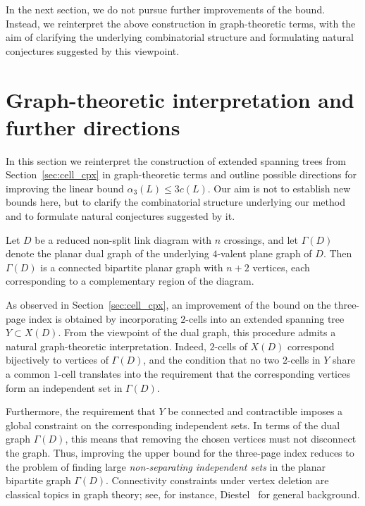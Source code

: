 \documentclass[11pt,a4paper]{amsart}
\begin{document}
In the next section, we do not pursue further improvements of the bound.
Instead, we reinterpret the above construction in graph-theoretic terms,
with the aim of clarifying the underlying combinatorial structure
and formulating natural conjectures suggested by this viewpoint.



\section{Graph-theoretic interpretation and further directions}\label{sec:graph}

In this section we reinterpret the construction of extended spanning trees
from Section~\ref{sec:cell_cpx} in graph-theoretic terms and outline
possible directions for improving the linear bound
$\alpha_3(L)\le 3c(L)$.
Our aim is not to establish new bounds here,
but to clarify the combinatorial structure underlying our method
and to formulate natural conjectures suggested by it.

Let $D$ be a reduced non-split link diagram with $n$ crossings,
and let $\Gamma(D)$ denote the planar dual graph of the underlying
$4$-valent plane graph of $D$.
Then $\Gamma(D)$ is a connected bipartite planar graph with $n+2$ vertices,
each corresponding to a complementary region of the diagram.

As observed in Section~\ref{sec:cell_cpx}, an improvement of the bound
on the three-page index is obtained by incorporating $2$-cells
into an extended spanning tree $Y\subset X(D)$.
From the viewpoint of the dual graph, this procedure admits a natural
graph-theoretic interpretation.
Indeed, $2$-cells of $X(D)$ correspond bijectively to vertices of
$\Gamma(D)$, and the condition that no two $2$-cells in $Y$
share a common $1$-cell translates into the requirement that the
corresponding vertices form an independent set in $\Gamma(D)$.

Furthermore, the requirement that $Y$ be connected and contractible
imposes a global constraint on the corresponding independent sets.
In terms of the dual graph $\Gamma(D)$, this means that removing the chosen
vertices must not disconnect the graph.
Thus, improving the upper bound for the three-page index reduces to the problem of finding large
\emph{non-separating independent sets}
in the planar bipartite graph $\Gamma(D)$.
Connectivity constraints under vertex deletion are classical topics in graph theory;
see, for instance, Diestel~\cite{Diest} for general background.
\end{document}
